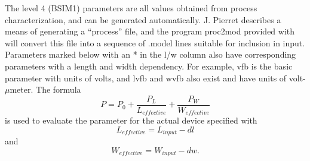 The level 4 (BSIM1) parameters are all values obtained from process
characterization, and can be generated automatically.
J. Pierret\cite{pierret} describes a means of generating a ``process''
file, and the program {\vt proc2mod} provided with {\WRspice} will convert this
file into a sequence of {\vt .model} lines suitable for inclusion in
{\WRspice} input.  Parameters marked below with an * in the l/w column
also have corresponding parameters with a length and width dependency.
For example, {\vt vfb} is the basic parameter with units of volts, and
{\vt lvfb} and {\vt wvfb} also exist and have units of
volt-$\mu$meter.  The formula
\begin{displaymath}
P = P_0 + \frac{P_L}{L_{effective}} + \frac{P_W}{W_{effective}}
\end{displaymath}
is used to evaluate the parameter for the actual device specified with
\begin{displaymath}
L_{effective} = L_{input} - dl
\end{displaymath}
and
\begin{displaymath}
W_{effective} = W_{input} - dw .
\end{displaymath}

